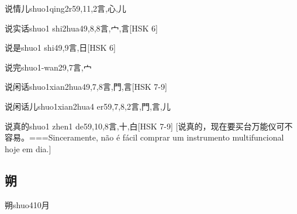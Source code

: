 \begin{EntryWithPhonetic}{说情儿}{shuo1qing2r5}{9,11,2}{⾔,⼼,⼉}
\end{EntryWithPhonetic}

\begin{EntryWithPhonetic}{说实话}{shuo1 shi2hua4}{9,8,8}{⾔,⼧,⾔}[HSK 6]
\end{EntryWithPhonetic}

\begin{EntryWithPhonetic}{说是}{shuo1 shi4}{9,9}{⾔,⽇}[HSK 6]
\end{EntryWithPhonetic}

\begin{EntryWithPhonetic}{说完}{shuo1-wan2}{9,7}{⾔,⼧}
\end{EntryWithPhonetic}

\begin{EntryWithPhonetic}{说闲话}{shuo1xian2hua4}{9,7,8}{⾔,⾨,⾔}[HSK 7-9]
\end{EntryWithPhonetic}

\begin{EntryWithPhonetic}{说闲话儿}{shuo1xian2hua4 er5}{9,7,8,2}{⾔,⾨,⾔,⼉}
\end{EntryWithPhonetic}

\begin{EntryWithPhonetic}{说真的}{shuo1 zhen1 de5}{9,10,8}{⾔,⼗,⽩}[HSK 7-9]
  [说真的，现在要买台万能仪可不容易。===Sinceramente, não é fácil comprar um instrumento multifuncional hoje em dia.]
\end{EntryWithPhonetic}

\subsection*{朔}

\begin{EntryWithPhonetic}{朔}{shuo4}{10}{⽉}
\end{EntryWithPhonetic}


